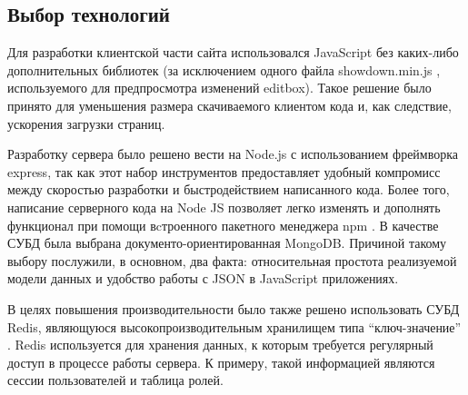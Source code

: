 \documentclass[14pt]{extarticle}
\begin{document}
\subsection{Выбор технологий}
Для разработки клиентской части сайта использовался JavaScript без каких-либо дополнительных библиотек (за исключением одного файла showdown.min.js \cite{showdown}, используемого для предпросмотра изменений editbox). Такое решение было принято для уменьшения размера скачиваемого клиентом кода и, как следствие, ускорения загрузки страниц.

Разработку сервера было решено вести на Node.js \cite{node-js} с использованием фреймворка express, так как этот набор инструментов предоставляет удобный компромисс между скоростью разработки и быстродействием написанного кода. Более того, написание серверного кода на Node JS позволяет легко изменять и дополнять функционал при помощи вcтроенного пакетного менеджера npm \cite{npm}.
В качестве СУБД была выбрана документо-ориентированная MongoDB. Причиной такому выбору послужили, в основном, два факта: относительная простота реализуемой модели данных и удобство работы с JSON в JavaScript приложениях.

В целях повышения производительности было также решено использовать СУБД Redis, являющуюся высокопроизводительным хранилищем типа “ключ-значение” \cite{Redis}. Redis используется для хранения данных, к которым требуется регулярный доступ в процессе работы сервера. К примеру, такой информацией являются сессии пользователей и таблица ролей.
\end{document}
